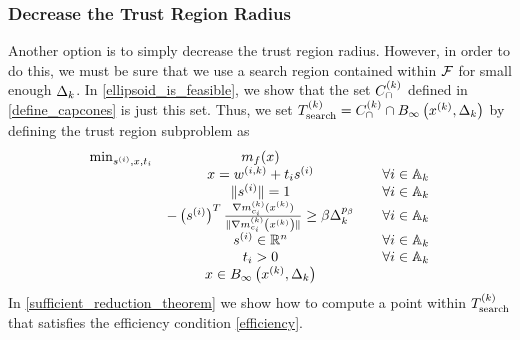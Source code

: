 


\subsubsection{Decrease the Trust Region Radius}
\label{decreasing_the_trust_region_for_infeasible_trial}

Another option is to simply decrease the trust region radius.
However, in order to do this, we must be sure that we use a search region contained within ${\mathcal F}$ for small enough $\Delta_k$.
In \cref{ellipsoid_is_feasible}, we show that the set ${C^{(k)}_{\cap}}$ defined in \cref{define_capcones} is just this set.
Thus, we set $ {T_{\text{search}}^{(k)}} = {C^{(k)}_{\cap}} \cap { B_{\infty}\left(x^{(k)}, \Delta_k\right) }$ by defining the trust region subproblem as
\begin{align}
\label{capcones_tr_subproblem}
\begin{array}{ccc}
\min_{s^{(i)},x,t_i} & m_f(x) & \\
 & x = {w^{(i, k)}} + t _i s^{(i)} & \quad \forall i \in {\mathbb A_{k}} \\
 & \|s^{(i)}\| = 1 & \quad \forall i \in {\mathbb A_{k}} \\
 & -\left(s^{(i)}\right)^T{\frac{\nabla m^{(k)}_{c_i}(x^{(k)})}{\|\nabla m^{(k)}_{c_i}\left(x^{(k)}\right)\|}} \ge \beta \Delta_k^{p_{\beta}} & \quad \forall i \in {\mathbb A_{k}} \\
 & s^{(i)} \in \mathbb R^n  & \quad \forall i \in {\mathbb A_{k}} \\
 & t_i > 0          & \quad \forall i \in {\mathbb A_{k}} \\
 & x \in { B_{\infty}\left(x^{(k)}, \Delta_k\right) }		& \\
\end{array}
\end{align}
In \cref{sufficient_reduction_theorem} we show how to compute a point within $ {T_{\text{search}}^{(k)}} $ that satisfies the efficiency condition \cref{efficiency}.



